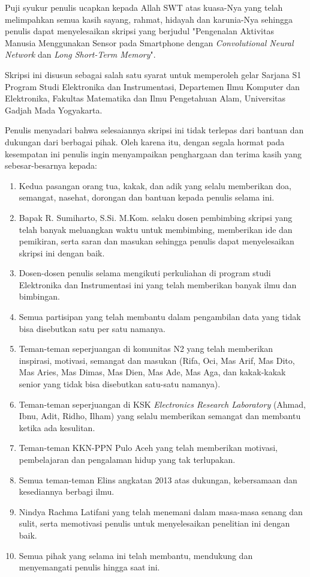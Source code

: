 \preface
Puji syukur penulis ucapkan kepada Allah SWT atas kuasa-Nya yang telah melimpahkan semua kasih sayang, rahmat, hidayah dan karunia-Nya sehingga penulis dapat menyelesaikan skripsi yang berjudul "Pengenalan Aktivitas Manusia Menggunakan Sensor pada Smartphone dengan \textit{Convolutional Neural Network} dan \textit{Long Short-Term Memory}".

Skripsi ini disusun sebagai salah satu syarat untuk memperoleh gelar Sarjana S1 Program Studi Elektronika dan Instrumentasi, Departemen Ilmu Komputer dan Elektronika, Fakultas Matematika dan Ilmu Pengetahuan Alam, Universitas Gadjah Mada Yogyakarta.

Penulis menyadari bahwa selesaiannya skripsi ini tidak terlepas dari bantuan dan dukungan dari berbagai pihak. Oleh karena itu, dengan segala hormat pada kesempatan ini penulis ingin menyampaikan penghargaan dan terima kasih yang sebesar-besarnya kepada:

\begin{enumerate}
    \item Kedua pasangan orang tua, kakak, dan adik yang selalu memberikan doa, semangat, nasehat, dorongan dan bantuan kepada penulis selama ini.
    \item Bapak R. Sumiharto, S.Si. M.Kom. selaku dosen pembimbing skripsi yang telah banyak meluangkan waktu untuk membimbing, memberikan ide dan pemikiran, serta saran dan masukan sehingga penulis dapat menyelesaikan skripsi ini dengan baik.
    \item Dosen-dosen penulis selama mengikuti perkuliahan di program studi Elektronika dan Instrumentasi ini yang telah memberikan banyak ilmu dan bimbingan.
    \item Semua partisipan yang telah membantu dalam pengambilan data yang tidak bisa disebutkan satu per satu namanya.
    \item Teman-teman seperjuangan di komunitas N2 yang telah memberikan inspirasi, motivasi, semangat dan masukan (Rifa, Oci, Mas Arif, Mas Dito, Mas Aries, Mas Dimas, Mas Dien, Mas Ade, Mas Aga, dan kakak-kakak senior yang tidak bisa disebutkan satu-satu namanya).
    \item Teman-teman seperjuangan di KSK \textit{Electronics Research Laboratory} (Ahmad, Ibnu, Adit, Ridho, Ilham) yang selalu memberikan semangat dan membantu ketika ada kesulitan.
    \item Teman-teman KKN-PPN Pulo Aceh yang telah memberikan motivasi, pembelajaran dan pengalaman hidup yang tak terlupakan.
    \item Semua teman-teman Elins angkatan 2013 atas dukungan, kebersamaan dan kesediannya berbagi ilmu.
    \item Nindya Rachma Latifani yang telah menemani dalam masa-masa senang dan sulit, serta memotivasi penulis untuk menyelesaikan penelitian ini dengan baik.
    \item Semua pihak yang selama ini telah membantu, mendukung dan menyemangati penulis hingga saat ini.
\end{enumerate}

